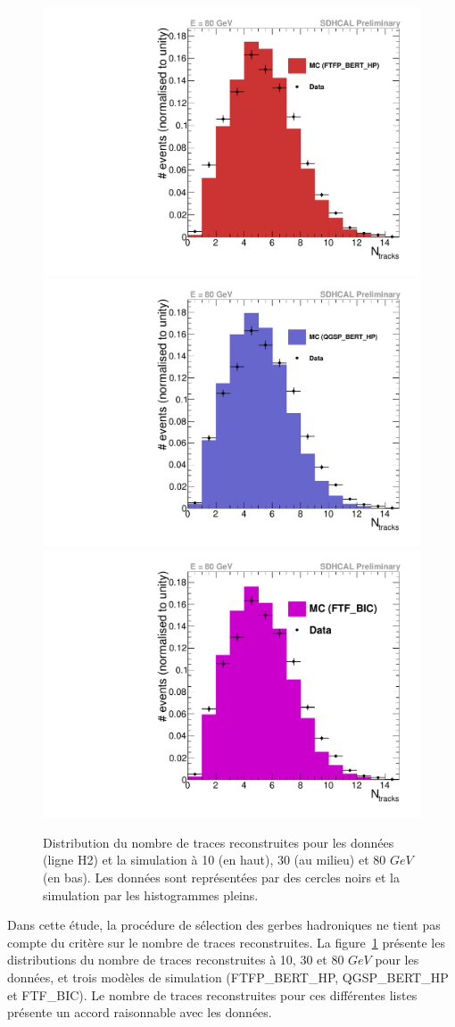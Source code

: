 \begin{figure}[!ht]
  \includegraphics[width=.32\textwidth]{Shower/figs/ntrack_pi-_80GeV_ftfp_bert_hp.pdf}
  \includegraphics[width=.32\textwidth]{Shower/figs/ntrack_pi-_80GeV_qgsp_bert_hp.pdf}
  \includegraphics[width=.32\textwidth]{Shower/figs/ntrack_pi-_80GeV_ftf_bic.pdf}
  \caption{Distribution du nombre de traces reconstruites pour les données (ligne H2) et la simulation à 10 (en haut), 30 (au milieu) et 80 $GeV$ (en bas). Les données sont représentées par des cercles noirs et la simulation par les histogrammes pleins. \label{fig.pi-_ntrack}}
\end{figure}
Dans cette étude, la procédure de sélection des gerbes hadroniques ne tient pas compte du critère sur le nombre de traces reconstruites. La figure~\ref{fig.pi-_ntrack} présente les distributions du nombre de traces reconstruites à 10, 30 et 80 $GeV$ pour les données, et trois modèles de simulation (FTFP\_BERT\_HP, QGSP\_BERT\_HP et FTF\_BIC). Le nombre de traces reconstruites pour ces différentes listes présente un accord raisonnable avec les données.

